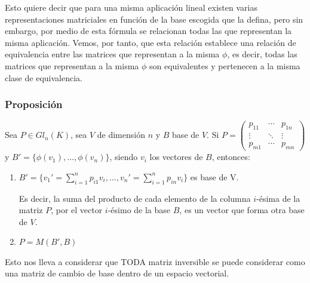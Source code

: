 \documentclass[10pt,a4paper,openright]{book}
\begin{document}
Esto quiere decir que para una misma aplicación lineal existen varias representaciones matriciales en función de la base escogida que la defina, pero sin embargo, por medio de esta fórmula se relacionan todas las que representan la misma  aplicación. Vemos, por tanto, que esta relación establece una relación de equivalencia entre las matrices que representan a la misma $\phi$, es decir, todas las matrices que representan a la misma $\phi$ son equivalentes y pertenecen a la misma clase de equivalencia.

\subsubsection*{Proposición}
Sea $P\in Gl_n(K)$, sea $V$ de dimensión $n$ y $B$ base de $V$. Si $P=\begin{pmatrix} p_{11} & \cdots & p_{1n} \\ \vdots & \ddots & \vdots \\ p_{m1} & \cdots & p_{mn}\end{pmatrix}$ y $B'=\{\phi(v_1), ..., \phi(v_n)\}$, siendo $v_i$ los vectores de $B$, entonces:
\begin{enumerate}
\item $B'=\{v_1'=\sum_{i=1}^np_{i1}v_i, ..., v_n'=\sum_{i=1}^n p_{in}v_i\}$ es base de V.\par
Es decir, la suma del producto de cada elemento de la columna $i$-ésima de la matriz $P$, por el vector $i$-ésimo de la base $B$, es un vector que forma otra base de $V$.

\item $P=M(B',B)$
\end{enumerate}

Esto nos lleva a considerar que TODA matriz inversible se puede considerar como una matriz de cambio de base dentro de un espacio vectorial.
\end{document}
